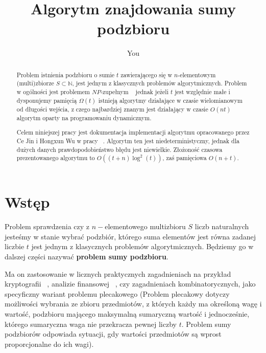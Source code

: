 \documentclass{article}
\title{Algorytm znajdowania sumy podzbioru}
\author{You}
\begin{document}
\maketitle

\begin{abstract}
Problem istnienia podzbioru o sumie $t$ zawierającego się w $n$-elementowym (multi)zbiorze $S \subset \mathbb{N}$, 
jest jednym z klasycznych problemów algorytmicznych. Problem w ogólności jest problemem $NP$-zupełnym ~\cite{agarwal2011encrypting}
jednak jeżeli $t$ jest względnie małe i dysponujemy pamięcią $\Omega(t)$ istnieją algorytmy działające 
w czasie wielomianowym od długości wejścia, z czego najbardziej znanym jest działający w czasie $O(nt)$ 
algorytm oparty na programowaniu dynamicznym.

Celem niniejszej pracy jest dokumentacja implementacji
algorytmu opracowanego przez Ce Jin i Hongxun Wu w pracy ~\cite{jin2018simple}. Algorytm ten jest niedeterministyczny,
jednak dla dużych danych prawdopodobieństwo błędu jest niewielkie. Złożoność czasowa prezentowanego
algorytmu to $O((t+n)\log^2(t))$, zaś pamięciowa $O(n+t)$.

\end{abstract}

\section{Wstęp}
Problem sprawdzenia czy z $n-$elementowego multizbioru $S$ liczb naturalnych jesteśmy w stanie wybrać 
podzbiór, którego suma elementów jest równa zadanej liczbie $t$ jest jednym z klasycznych problemów 
algorytmicznych. Będziemy go w dalszej części nazywać \textbf{problem sumy podzbioru}. 

Ma on zastosowanie w licznych praktycznych zagadnieniach na przykład kryptografii
~\cite{agarwal2011encrypting}, analizie finansowej 
~\cite{biesner2022solving}, czy zagadnieniach kombinatorycznych, jako specyficzny
wariant problemu plecakowego (Problem plecakowy dotyczy możliwości wybrania ze zbioru przedmiotów, z których każdy ma 
określoną wagę i wartość, podzbioru mającego maksymalną sumaryczną wartość i jednocześnie, którego 
sumaryczna waga nie przekracza pewnej liczby $t$. Problem sumy podzbiorów odpowiada sytuacji, 
gdy wartości przedmiotów są wprost proporcjonalne do ich wagi). 
\end{document}
